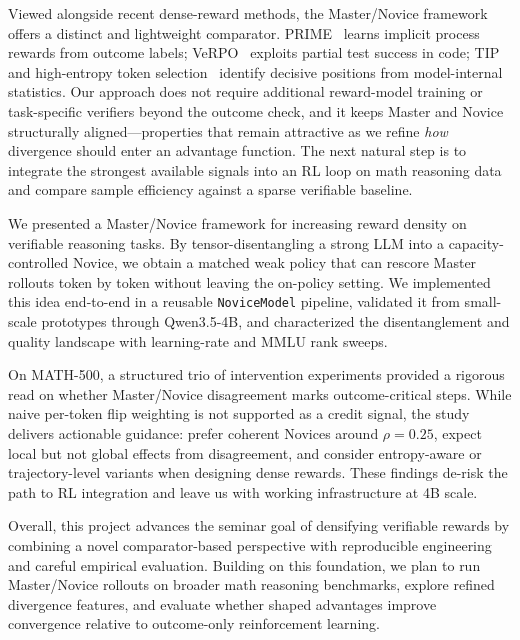 \documentclass[times, 10pt,twocolumn]{article}
\begin{document}
Viewed alongside recent dense-reward methods, the Master/Novice framework offers
a distinct and lightweight comparator. PRIME~\cite{cui2025prime} learns implicit
process rewards from outcome labels; VeRPO~\cite{wang2026verpo} exploits partial
test success in code; TIP~\cite{xu2026tip} and high-entropy token
selection~\cite{wang2025forking} identify decisive positions from model-internal
statistics. Our approach does not require additional reward-model training or
task-specific verifiers beyond the outcome check, and it keeps Master and Novice
structurally aligned---properties that remain attractive as we refine \emph{how}
divergence should enter an advantage function. The next natural step is to
integrate the strongest available signals into an RL loop on math reasoning
data and compare sample efficiency against a sparse verifiable baseline.



We presented a Master/Novice framework for increasing reward density on
verifiable reasoning tasks. By tensor-disentangling a strong LLM into a
capacity-controlled Novice, we obtain a matched weak policy that can rescore
Master rollouts token by token without leaving the on-policy setting. We
implemented this idea end-to-end in a reusable \texttt{NoviceModel} pipeline,
validated it from small-scale prototypes through Qwen3.5-4B, and characterized
the disentanglement and quality landscape with learning-rate and MMLU rank
sweeps.

On MATH-500, a structured trio of intervention experiments provided a rigorous
read on whether Master/Novice disagreement marks outcome-critical steps. While
naive per-token flip weighting is not supported as a credit signal, the study
delivers actionable guidance: prefer coherent Novices around $\rho{=}0.25$,
expect local but not global effects from disagreement, and consider entropy-aware
or trajectory-level variants when designing dense rewards. These findings
de-risk the path to RL integration and leave us with working infrastructure at
4B scale.

Overall, this project advances the seminar goal of densifying verifiable rewards
by combining a novel comparator-based perspective with reproducible engineering
and careful empirical evaluation. Building on this foundation, we plan to run
Master/Novice rollouts on broader math reasoning benchmarks, explore refined
divergence features, and evaluate whether shaped advantages improve convergence
relative to outcome-only reinforcement learning.


\end{document}
